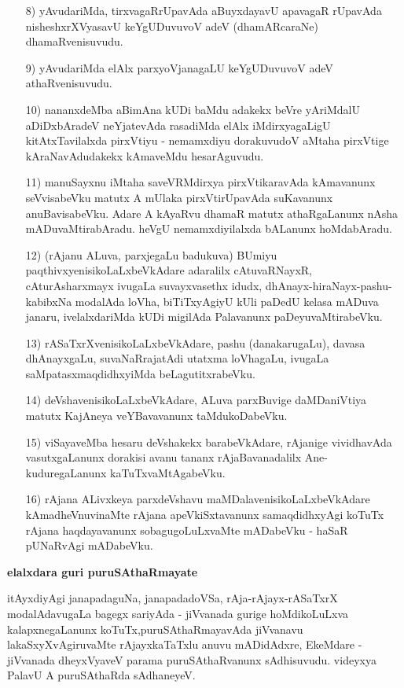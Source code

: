 \begin{itemize}
\item [8)] yAvudariMda, tirxvagaRrUpavAda aBuyxdayavU apavagaR rUpavAda nisheshxrXVyasavU keYgUDu\-vuvoV adeV (dhamARcaraNe) dhamaRvenisuvudu.
\item [9)] yAvudariMda elAlx parxyoVjanagaLU keYgUDuvuvoV adeV athaRvenisuvudu.
\item [10)] nananxdeMba aBimAna kUDi baMdu adakekx beVre yAriMdalU aDiDxbAradeV neYjatevAda rasadiMda elAlx iMdirxyagaLigU kitAtxTavilalxda pirxVtiyu - nemamxdiyu dorakuvudoV aMtaha pirxVtige kAraNavAdudakekx kAmaveMdu hesarAguvudu. 
\item [11)] manuSayxnu iMtaha saveVRMdirxya pirxVtikaravAda kAmavanunx seVvisabeVku matutx A mUlaka pirxVtirUpavAda suKavanunx anuBavisabeVku. Adare A kAyaRvu dhamaR matutx athaRgaLanunx nAsha mADuvaMtirabAradu. heVgU nemamxdiyilalxda bALanunx hoMdabAradu.
\item [12)] (rAjanu ALuva, parxjegaLu badukuva) BUmiyu paqthivxyenisikoLaLx\-beVkAdare adaralilx cAtu\-vaR\-NayxR, cAturAsharxmayx ivugaLa suvayxvasethx idudx, dhAnayx-hiraNayx-pashu-kabibxNa modalAda \-loVha, biTiTxyAgiyU kUli paDedU kelasa mADuva janaru, ivelalxdariMda kUDi migilAda Pala\-vanunx paDeyuvaMtirabeVku.
\item [13)] rASaTxrXvenisikoLaLxbeVkAdare, pashu (danakarugaLu), davasa dhAnayxgaLu, suvaNaRrajatAdi utatxma loVhagaLu, ivugaLa saMpatasxmaqdidhxyiMda beLagutitxrabeVku.
\item [14)] deVshavenisikoLaLxbeVkAdare, ALuva parxBuvige daMDaniVtiya matutx KajAneya veYBavavanunx taMdu\-koDa\-beVku.
\item [15)] viSayaveMba hesaru deVshakekx barabeVkAdare, rAjanige vividhavAda vasutxgaLanunx dorakisi avanu tananx rAjaBavanadalilx Ane-kuduregaLanunx kaTuTxvaMtAgabeVku.
\item [16)] rAjana ALivxkeya parxdeVshavu maMDalavenisikoLaLxbeVkAdare kAmadheVnuvinaMte rAjana apeVkiSxta\-vanunx samaqdidhxyAgi koTuTx rAjana haqdayavanunx sobagugoLuLxvaMte mADabeVku - haSaR pUNaR\-vAgi mADabeVku.
\end{itemize}

{\bigskip
\noindent
{\large\bf elalxdara guri puruSAthaRmayate}}\label{page96}
\medskip

\noindent
itAyxdiyAgi janapadaguNa, janapadadoVSa, rAja-rAjayx-rASaTxrX modalAdavu\-gaLa bagegx sari\-yAda -\- jiVvanada gurige hoMdikoLuLxva kalapxnegaLanunx koTuTx,\break puruSAthaRmayavAda jiVvanavu lakaSxyXvAgiru\-vaMte rAjayxkaTaTxlu anuvu mADi\-dAdxre, EkeMdare - jiVvanada dheyxVyaveV parama puruSAthaRvanunx sAdhisu\-vudu. videyxya PalavU A puruSAthaRda sAdhaneyeV.

